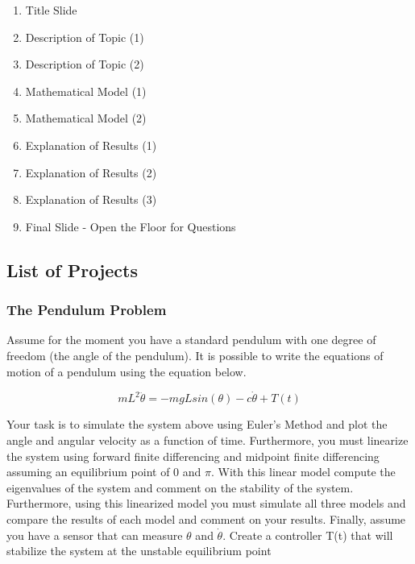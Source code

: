 \begin{enumerate}[1]
\setlength\itemsep{-2pt}

  \item Title Slide

  \item Description of Topic (1)
    
  \item Description of Topic (2)

  \item Mathematical Model (1)

  \item Mathematical Model (2)

  \item Explanation of Results (1)

  \item Explanation of Results (2)

  \item Explanation of Results (3)

  \item Final Slide - Open the Floor for Questions
   
\end{enumerate}

\subsection{\bf List of Projects}

\subsubsection{The Pendulum Problem}

Assume for the moment you have a standard
pendulum with one degree of freedom (the angle of the pendulum). It
is possible to write the equations of motion of a pendulum using the
equation below.

\begin{equation}
  m L^2 \ddot{\theta} = -m g L sin(\theta) - c \dot{\theta} + T(t)
\end{equation}

Your task is to simulate the system above using Euler's Method and
plot the angle and angular velocity as a function of
time. Furthermore, you must linearize the system using forward
finite differencing and midpoint finite differencing assuming an
equilibrium point of 0 and $\pi$. With this linear model compute the
eigenvalues of the system 
and comment on the stability of the system. Furthermore, using this
linearized model you must simulate all three models and 
compare the results of each model and comment on your
results. Finally, assume you have a sensor that can measure $\theta$
and $\dot{\theta}$. Create a controller T(t) that will stabilize the
system at the unstable equilibrium point 

